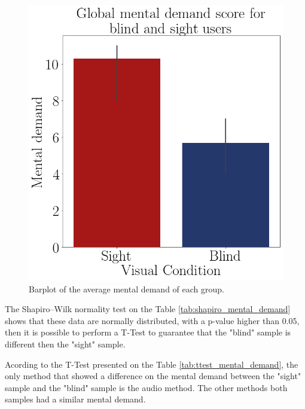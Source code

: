 \begin{figure}[!htb]
\begin{minipage}{.45\linewidth}
        \vspace{1.8cm}
        \centering
        \includegraphics[width = \linewidth]{Resultados/Nasa/Figuras/png/barplot_md_avg_global.png}
        \caption{Barplot of the average mental demand of each group.}
        \label{fig:barplot_md_global}
    \end{minipage}
\end{figure}

The Shapiro–Wilk normality test on the Table \ref{tab:shapiro_mental_demand} shows that these data are normally distributed, with a p-value higher than 0.05, then it is possible to perform a T-Test to guarantee that the "blind" sample is different then the "sight" sample.



Acording to the T-Test presented on the Table \ref{tab:ttest_mental_demand}, the only method that showed a difference on the mental demand between the "sight" sample and the "blind" sample is the audio method. The other methods both samples had a similar mental demand.

